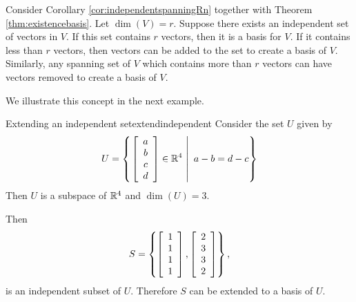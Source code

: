 Consider Corollary \ref{cor:independentspanningRn} together with Theorem \ref{thm:existencebasis}. Let $\dim(V) = r$. Suppose there exists an independent set of vectors in $V$. If this set contains $r$ vectors, then it is a basis for $V$. If it contains less than $r$ vectors, then vectors can be added to the set to create a basis of $V$. Similarly, any spanning set of $V$ which contains more than $r$ vectors can have vectors removed to create a basis of $V$.

We illustrate this concept in the next example.

\begin{example}{Extending an independent set}{extendindependent}
Consider the set $U$ given by 
\[ U=\left\{ \left.\left[\begin{array}{c} a\\ b\\ c\\ d\end{array}\right]
\in\mathbb{R}^4 ~\right|~ a-b=d-c \right\}\]
Then $U$ is a subspace of $\mathbb{R}^4$ and $\dim(U)=3$.

Then
\[S=\left\{ 
\left[\begin{array}{c} 1\\ 1\\ 1\\ 1\end{array}\right],
\left[\begin{array}{c} 2\\ 3\\ 3\\ 2\end{array}\right] \right\},\]
is an independent subset of $U$.
Therefore $S$ can be extended to a basis of $U$.
\end{example}

